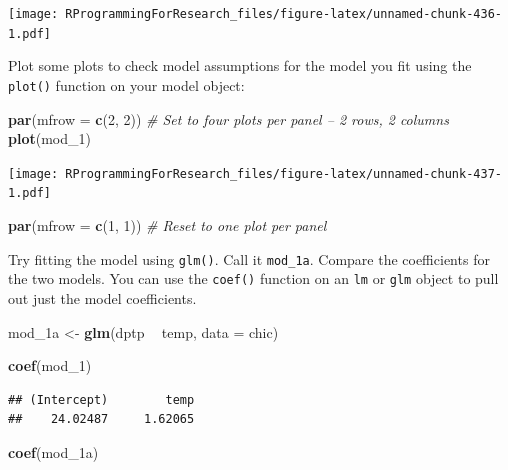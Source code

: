 \documentclass[]{book}
\makeatletter
\newenvironment{Shaded}{\begin{snugshade}}{\end{snugshade}}
\newcommand{\KeywordTok}[1]{\textcolor[rgb]{0.13,0.29,0.53}{\textbf{#1}}}
\newcommand{\DataTypeTok}[1]{\textcolor[rgb]{0.13,0.29,0.53}{#1}}
\newcommand{\DecValTok}[1]{\textcolor[rgb]{0.00,0.00,0.81}{#1}}
\newcommand{\StringTok}[1]{\textcolor[rgb]{0.31,0.60,0.02}{#1}}
\newcommand{\CommentTok}[1]{\textcolor[rgb]{0.56,0.35,0.01}{\textit{#1}}}
\newcommand{\OperatorTok}[1]{\textcolor[rgb]{0.81,0.36,0.00}{\textbf{#1}}}
\newcommand{\NormalTok}[1]{#1}
\newenvironment{kframe}{%
\medskip{}
\setlength{\fboxsep}{.8em}
 \def\at@end@of@kframe{}%
 \ifinner\ifhmode%
  \def\at@end@of@kframe{\end{minipage}}%
  \begin{minipage}{\columnwidth}%
 \fi\fi%
 \def\FrameCommand##1{\hskip\@totalleftmargin \hskip-\fboxsep
 \colorbox{shadecolor}{##1}\hskip-\fboxsep
     \hskip-\linewidth \hskip-\@totalleftmargin \hskip\columnwidth}%
 \MakeFramed {\advance\hsize-\width
   \@totalleftmargin\z@ \linewidth\hsize
   \@setminipage}}%
 {\par\unskip\endMakeFramed%
 \at@end@of@kframe}
\renewenvironment{Shaded}{\begin{kframe}}{\end{kframe}}
\theoremstyle{definition}
\theoremstyle{definition}
\theoremstyle{definition}
\theoremstyle{remark}
\makeatother
\begin{document}
\texttt{[image: RProgrammingForResearch\_files/figure-latex/unnamed-chunk-436-1.pdf]}

Plot some plots to check model assumptions for the model you fit using
the \texttt{plot()} function on your model object:

\begin{Shaded}
\begin{Highlighting}[]
\KeywordTok{par}\NormalTok{(}\DataTypeTok{mfrow =} \KeywordTok{c}\NormalTok{(}\DecValTok{2}\NormalTok{, }\DecValTok{2}\NormalTok{)) }\CommentTok{# Set to four plots per panel -- 2 rows, 2 columns}
\KeywordTok{plot}\NormalTok{(mod_}\DecValTok{1}\NormalTok{)}
\end{Highlighting}
\end{Shaded}

\texttt{[image: RProgrammingForResearch\_files/figure-latex/unnamed-chunk-437-1.pdf]}

\begin{Shaded}
\begin{Highlighting}[]
\KeywordTok{par}\NormalTok{(}\DataTypeTok{mfrow =} \KeywordTok{c}\NormalTok{(}\DecValTok{1}\NormalTok{, }\DecValTok{1}\NormalTok{)) }\CommentTok{# Reset to one plot per panel}
\end{Highlighting}
\end{Shaded}

Try fitting the model using \texttt{glm()}. Call it \texttt{mod\_1a}.
Compare the coefficients for the two models. You can use the
\texttt{coef()} function on an \texttt{lm} or \texttt{glm} object to
pull out just the model coefficients.

\begin{Shaded}
\begin{Highlighting}[]
\NormalTok{mod_1a <-}\StringTok{ }\KeywordTok{glm}\NormalTok{(dptp }\OperatorTok{~}\StringTok{ }\NormalTok{temp, }\DataTypeTok{data =}\NormalTok{ chic)}

\KeywordTok{coef}\NormalTok{(mod_}\DecValTok{1}\NormalTok{)}
\end{Highlighting}
\end{Shaded}

\begin{verbatim}
## (Intercept)        temp 
##    24.02487     1.62065
\end{verbatim}

\begin{Shaded}
\begin{Highlighting}[]
\KeywordTok{coef}\NormalTok{(mod_1a)}
\end{Highlighting}
\end{Shaded}
\end{document}
